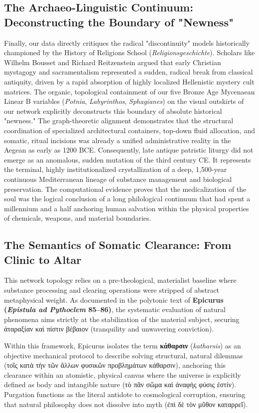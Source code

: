 \documentclass[11pt,twoside,a4paper]{article}
\begin{document}
\subsection{The Archaeo-Linguistic Continuum: Deconstructing the Boundary of "Newness"}
Finally, our data directly critiques the radical "discontinuity" models historically championed by the History of Religions School (\textit{Religionsgeschichte}). Scholars like Wilhelm Bousset \cite{bousset1913kyrios} and Richard Reitzenstein \cite{reitzenstein1910hellenistische} argued that early Christian mystagogy and sacramentalism represented a sudden, radical break from classical antiquity, driven by a rapid absorption of highly localized Hellenistic mystery cult matrices.
The organic, topological containment of our five Bronze Age Mycenaean Linear B variables (\textit{Potnia}, \textit{Labyrinthos}, \textit{Sphagianes}) on the visual outskirts of our network explicitly deconstructs this boundary of absolute historical "newness." The graph-theoretic alignment demonstrates that the structural coordination of specialized architectural containers, top-down fluid allocation, and somatic, ritual incisions was already a unified administrative reality in the Aegean as early as 1200 BCE.
Consequently, late antique patristic liturgy did not emerge as an anomalous, sudden mutation of the third century CE. It represents the terminal, highly institutionalized crystallization of a deep, 1,500-year continuous Mediterranean lineage of substance management and biological preservation. The computational evidence proves that the medicalization of the soul was the logical conclusion of a long philological continuum that had spent a millennium and a half anchoring human salvation within the physical properties of chemicals, weapons, and material boundaries.

\subsection{The Semantics of Somatic Clearance: From Clinic to Altar}
This network topology relies on a pre-theological, materialist baseline where substance processing and clearing operations were stripped of abstract metaphysical weight. As documented in the polytonic text of \textbf{Epicurus (\textit{Epistula ad Pythoclem} 85--86)}, the systematic evaluation of natural phenomena aims strictly at the stabilization of the material subject, securing \textgreek{ἀταραξίαν καὶ πίστιν βέβαιον} (tranquility and unwavering conviction). 

Within this framework, Epicurus isolates the term \textgreek{\textbf{κάθαρσιν}} (\textit{katharsis}) as an objective mechanical protocol to describe solving structural, natural dilemmas (\textgreek{τοῖς κατὰ τὴν τῶν ἄλλων φυσικῶν προβλημάτων κάθαρσιν}), anchoring this clearance within an atomistic, physical canvas where the universe is explicitly defined as body and intangible nature (\textgreek{τὸ πᾶν σῶμα καὶ ἀναφὴς φύσις ἐστίν}). Purgation functions as the literal antidote to cosmological corruption, ensuring that natural philosophy does not dissolve into myth (\textgreek{ἐπὶ δὲ τὸν μῦθον καταρρεῖ}).
\end{document}
